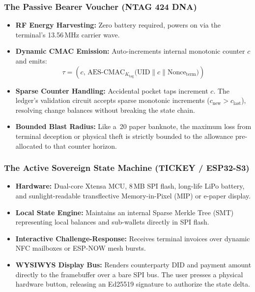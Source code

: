 \documentclass[a4paper,11pt,twoside,parskip=half-,headings=small]{scrartcl}
\newcommand{\EUR}[1]{\texteuro\,#1}
\begin{document}
\subsubsection{The Passive Bearer Voucher (NTAG 424 DNA)}
\begin{itemize}
  \item \textbf{RF Energy Harvesting:} Zero battery required, powers on via the terminal's
13.56\,MHz carrier wave.
  \item \textbf{Dynamic CMAC Emission:} Auto-increments internal monotonic counter $c$ and emits:
\begin{equation}
\tau = \left( c,\, \text{AES-CMAC}_{K_{\text{tag}}}\bigl(\text{UID} \parallel c \parallel \text{Nonce}_{\text{term}}\bigr) \right)
\end{equation}
  \item \textbf{Sparse Counter Handling:} Accidental pocket taps increment $c$. The ledger's
validation circuit accepts sparse monotonic increments ($c_{\text{new}} > c_{\text{last}}$),
resolving change balances without breaking the state chain.
  \item \textbf{Bounded Blast Radius:} Like a \EUR{20} paper banknote, the maximum loss from
terminal deception or physical theft is strictly bounded to the allowance pre-allocated
to that counter horizon.
\end{itemize}

\subsubsection{The Active Sovereign State Machine (TICKEY / ESP32-S3)}
\begin{itemize}
  \item \textbf{Hardware:} Dual-core Xtensa MCU, 8\,MB SPI flash, long-life LiPo battery,
and sunlight-readable transflective Memory-in-Pixel (MIP) or e-paper display.
  \item \textbf{Local State Engine:} Maintains an internal Sparse Merkle Tree (SMT) representing
local balances and sub-wallets directly in SPI flash.
  \item \textbf{Interactive Challenge-Response:} Receives terminal invoices over dynamic NFC
mailboxes or ESP-NOW mesh bursts.
  \item \textbf{WYSIWYS Display Bus:} Renders counterparty DID and payment amount directly
to the framebuffer over a bare SPI bus. The user presses a physical hardware button,
releasing an Ed25519 signature to authorize the state delta.
\end{itemize}
\end{document}
